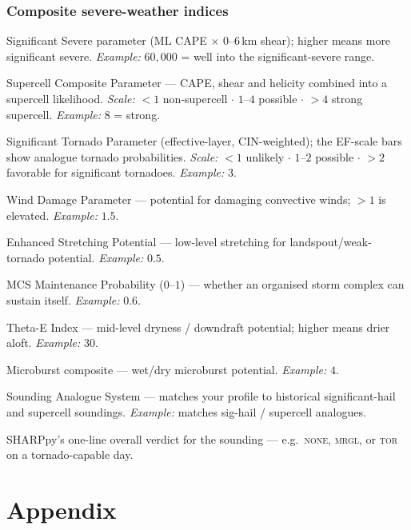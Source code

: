 \documentclass[11pt,openany]{report}
\begin{document}
\subsection{Composite severe-weather indices}
\begin{description}[leftmargin=2.6cm,style=nextline]
  \item[SigSvr] Significant Severe parameter (ML CAPE $\times$ 0--6\,km shear); higher means more
        significant severe. \emph{Example:} $60{,}000$ = well into the significant-severe range.
  \item[Supercell] Supercell Composite Parameter --- CAPE, shear and helicity combined into a
        supercell likelihood. \emph{Scale:} $<\!1$ non-supercell $\cdot$ $1$--$4$ possible $\cdot$
        $>\!4$ strong supercell. \emph{Example:} $8$ = strong.
  \item[STP] Significant Tornado Parameter (effective-layer, CIN-weighted); the EF-scale bars show
        analogue tornado probabilities. \emph{Scale:} $<\!1$ unlikely $\cdot$ $1$--$2$ possible
        $\cdot$ $>\!2$ favorable for significant tornadoes. \emph{Example:} $3$.
  \item[WNDG] Wind Damage Parameter --- potential for damaging convective winds; $>\!1$ is elevated.
        \emph{Example:} $1.5$.
  \item[ESP] Enhanced Stretching Potential --- low-level stretching for landspout/weak-tornado
        potential. \emph{Example:} $0.5$.
  \item[MMP] MCS Maintenance Probability ($0$--$1$) --- whether an organised storm complex can
        sustain itself. \emph{Example:} $0.6$.
  \item[TEI] Theta-E Index --- mid-level dryness / downdraft potential; higher means drier aloft.
        \emph{Example:} $30$.
  \item[MBURST] Microburst composite --- wet/dry microburst potential. \emph{Example:} $4$.
  \item[SARS] Sounding Analogue System --- matches your profile to historical significant-hail and
        supercell soundings. \emph{Example:} matches sig-hail / supercell analogues.
  \item[Poss.\ Hazard Type] SHARPpy's one-line overall verdict for the sounding --- e.g.\
        \textsc{none}, \textsc{mrgl}, or \textsc{tor} on a tornado-capable day.
\end{description}

\chapter{Appendix}
\end{document}

